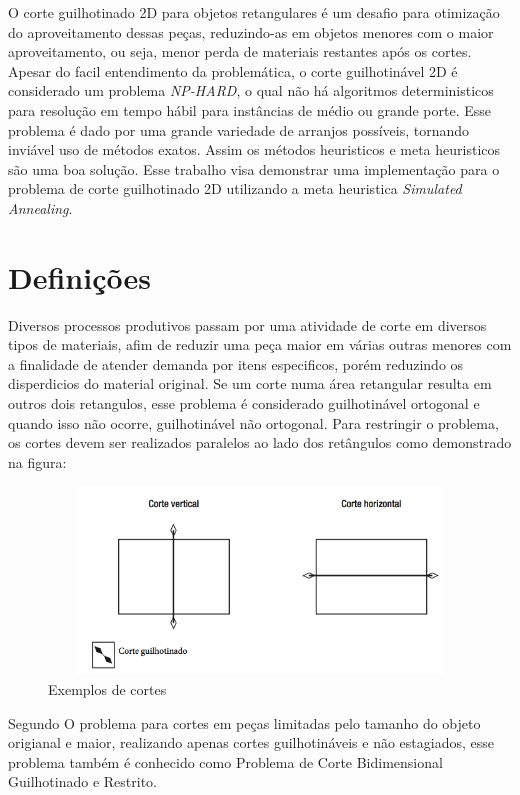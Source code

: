\documentclass[12pt]{article}
\begin{document}
O corte guilhotinado 2D para objetos retangulares é um desafio para otimização do aproveitamento dessas peças, reduzindo-as em objetos menores com o maior aproveitamento, ou seja, menor perda de materiais restantes após os cortes. 
Apesar do facil entendimento da problemática, o corte guilhotinável 2D é considerado um problema \textit{NP-HARD}, o qual não há algoritmos deterministicos para resolução em tempo hábil para instâncias de médio ou grande porte.
Esse problema é dado por uma grande variedade de arranjos possíveis, tornando inviável uso de métodos exatos. Assim os métodos heuristicos e meta heuristicos são uma boa solução.
Esse trabalho visa demonstrar uma implementação para o problema de corte guilhotinado 2D utilizando a meta heuristica \textit{Simulated Annealing}. 

\section*{Definições}
	
	Diversos processos produtivos passam por uma atividade de corte em diversos tipos de materiais, afim de reduzir uma peça maior em várias outras menores com a finalidade de atender demanda por itens especificos, porém reduzindo os disperdicios do material original. 
	Se um corte numa área retangular resulta em outros dois retangulos, esse problema é considerado guilhotinável ortogonal e quando isso não ocorre, guilhotinável não ortogonal. Para restringir o problema, os cortes devem ser realizados paralelos ao lado dos retângulos como demonstrado na figura:
	
	\begin{figure}[h]
    \centering
    \includegraphics[width=15cm, height=5cm]{imagens/guilhotine2}
    \caption{Exemplos de cortes}
  \end{figure}
	
		Segundo   O problema para cortes em peças limitadas pelo tamanho do objeto origianal e maior, realizando apenas cortes guilhotináveis e não estagiados, esse problema também é conhecido como  Problema de Corte Bidimensional Guilhotinado e Restrito.
	
\end{document}
